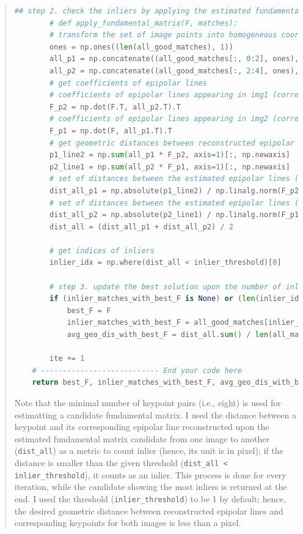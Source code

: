 \documentclass[11pt]{article}
\begin{document}
\begin{quote}
\begin{lstlisting}[language=Python, basicstyle=\scriptsize]
        ## step 2. check the inliers by applying the estimated fundamental matrix to the whole matches
        # def apply_fundamental_matrix(F, matches):
        # transform the set of image points into homogeneous coordinates
        ones = np.ones((len(all_good_matches), 1))
        all_p1 = np.concatenate((all_good_matches[:, 0:2], ones), axis=1)
        all_p2 = np.concatenate((all_good_matches[:, 2:4], ones), axis=1)
        # get coefficients of epipolar lines
        # coefficients of epipolar lines appearing in img1 (corresponding to epipoles all_p1)
        F_p2 = np.dot(F.T, all_p2.T).T
        # coefficients of epipolar lines appearing in img2 (corresponding to epipoles all_p2)
        F_p1 = np.dot(F, all_p1.T).T
        # get geometric distances between reconstructed epipolar lines and corresponding epipoles
        p1_line2 = np.sum(all_p1 * F_p2, axis=1)[:, np.newaxis]
        p2_line1 = np.sum(all_p2 * F_p1, axis=1)[:, np.newaxis]
        # set of distances between the estimated epipolar lines (projected from p2) and epipoles (p1)
        dist_all_p1 = np.absolute(p1_line2) / np.linalg.norm(F_p2, axis=1)[:, np.newaxis]
        # set of distances between the estimated epipolar lines (projected from p1) and epipoles (p2)
        dist_all_p2 = np.absolute(p2_line1) / np.linalg.norm(F_p1, axis=1)[:, np.newaxis]
        dist_all = (dist_all_p1 + dist_all_p2) / 2

        # get indices of inliers
        inlier_idx = np.where(dist_all < inlier_threshold)[0]

        # step 3. update the best solution upon the number of inliers 
        if (inlier_matches_with_best_F is None) or (len(inlier_idx) > len(inlier_matches_with_best_F)):
            best_F = F
            inlier_matches_with_best_F = all_good_matches[inlier_idx]
            avg_geo_dis_with_best_F = dist_all.sum() / len(all_matches)

        ite += 1
    # --------------------------- End your code here
    return best_F, inlier_matches_with_best_F, avg_geo_dis_with_best_F
\end{lstlisting}

Note that the minimal number of keypoint pairs (i.e., eight) is used for estimatting a candidate fundamental matrix. I used the distance between a keypoint and its corresponding epipolar line reconstructed upon the estimated fundamental matrix candidate from one image to another (\texttt{dist\_all}) as a metric to count inlier (hence, its unit is in pixel); if the distance is smaller than the given threshold (\texttt{dist\_all < inlier\_threshold}), it counts as an inlier. This process is done for every iteration, while the candidate showing the most inliers is returned at the end. I used the threshold (\texttt{inlier\_threshold}) to be 1 by default; hence, the desired geometric distance between reconstructed epipolar lines and corresponding keypoints for both images is less than a pixel.


\end{quote}
\end{document}
